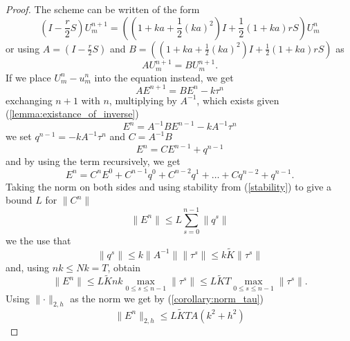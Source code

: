 \begin{proof}
    The scheme can be written of the form
    $$\left(I - \frac{r}{2}S \right)U_{m}^{n+1} = \left( \left(1+ka+\frac{1}{2}(ka)^2\right)I + \frac{1}{2}\left(1+ka\right)rS\right)U_{m}^n$$
    or using $A = \left(I - \frac{r}{2}S \right)$ and $B = \left( \left(1+ka+\frac{1}{2}(ka)^2\right)I + \frac{1}{2}\left(1+ka\right)rS\right)$ as
    $$AU_{m}^{n+1} = BU_{m}^{n+1}.$$
    If we place $U_m^n - u_m^n$ into the equation instead, we get
    $$AE^{n+1} = BE^n - k\tau^n$$
    exchanging $n+1$ with $n$, multiplying by $A^{-1}$, which exists given (\ref{lemma:existance_of_inverse})
    $$E^n = A^{-1}BE^{n-1} -kA^{-1}\tau^n$$
    we set $q^{n-1}= -kA^{-1}\tau^n$ and $C=A^{-1}B$
    $$E^n = CE^{n-1}+q^{n-1}$$
    and by using the term recursively, we get
    $$E^n = C^nE^{0}+C^{n-1}q^0 + C^{n-2}q^1 + \dots + C q^{n-2} +  q^{n-1}.$$
    Taking the norm on both sides and using stability from (\ref{stability}) to give a bound $L$ for $\lVert C^n \lVert$
    $$\lVert E^n\lVert  \leq L\sum_{s=0}^{n-1}\lVert q^s \lVert$$
    we the use that 
    $$\lVert q^s \lVert \leq k \lVert A^{-1} \lVert \lVert\tau^s \lVert \leq k \tilde{K} \lVert\tau^s \lVert$$
    and, using $nk\leq Nk=T$, obtain
    $$\lVert E^n \lVert \leq L \tilde{K}nk \max_{0\leq s \leq n-1} \lVert \tau^s\lVert \leq L \tilde{K}T\max_{0\leq s \leq n-1} \lVert \tau^s\lVert.$$
    Using $\lVert \cdot \lVert_{2, h}$ as the norm we get by (\ref{corollary:norm_tau})
    $$\lVert E^n \lVert_{2, h} \leq L \tilde{K}TA(k^2+h^2)$$
\end{proof}


